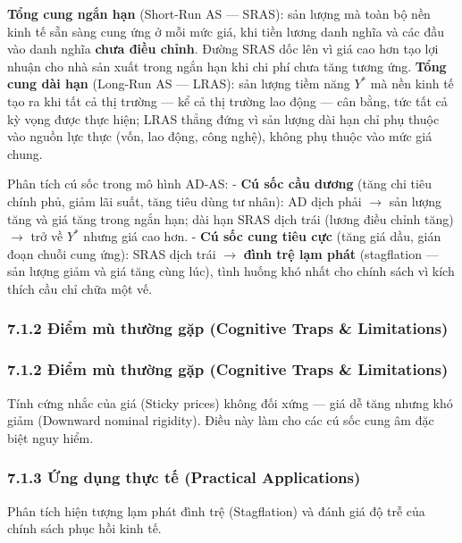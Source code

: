 \documentclass[
]{article}
\begin{document}
\textbf{Tổng cung ngắn hạn} (Short-Run AS --- SRAS): sản lượng mà toàn
bộ nền kinh tế sẵn sàng cung ứng ở mỗi mức giá, khi tiền lương danh
nghĩa và các đầu vào danh nghĩa \textbf{chưa điều chỉnh}. Đường SRAS dốc
lên vì giá cao hơn tạo lợi nhuận cho nhà sản xuất trong ngắn hạn khi chi
phí chưa tăng tương ứng. \textbf{Tổng cung dài hạn} (Long-Run AS ---
LRAS): sản lượng tiềm năng \(Y^*\) mà nền kinh tế tạo ra khi tất cả thị
trường --- kể cả thị trường lao động --- cân bằng, tức tất cả kỳ vọng
được thực hiện; LRAS thẳng đứng vì sản lượng dài hạn chỉ phụ thuộc vào
nguồn lực thực (vốn, lao động, công nghệ), không phụ thuộc vào mức giá
chung.

Phân tích cú sốc trong mô hình AD-AS: - \textbf{Cú sốc cầu dương} (tăng
chi tiêu chính phủ, giảm lãi suất, tăng tiêu dùng tư nhân): AD dịch phải
\(\rightarrow\) sản lượng tăng và giá tăng trong ngắn hạn; dài hạn SRAS
dịch trái (lương điều chỉnh tăng) \(\rightarrow\) trở về \(Y^*\) nhưng
giá cao hơn. - \textbf{Cú sốc cung tiêu cực} (tăng giá dầu, gián đoạn
chuỗi cung ứng): SRAS dịch trái \(\rightarrow\) \textbf{đình trệ lạm
phát} (stagflation --- sản lượng giảm và giá tăng cùng lúc), tình huống
khó nhất cho chính sách vì kích thích cầu chỉ chữa một vế.

\subsubsection{7.1.2 Điểm mù thường gặp (Cognitive Traps \&
Limitations)}\label{ux111iux1ec3m-muxf9-thux1b0ux1eddng-gux1eb7p-cognitive-traps-limitations-31}

\subsubsection{7.1.2 Điểm mù thường gặp (Cognitive Traps \&
Limitations)}\label{ux111iux1ec3m-muxf9-thux1b0ux1eddng-gux1eb7p-cognitive-traps-limitations-32}

Tính cứng nhắc của giá (Sticky prices) không đối xứng --- giá dễ tăng
nhưng khó giảm (Downward nominal rigidity). Điều này làm cho các cú sốc
cung âm đặc biệt nguy hiểm.

\subsubsection{7.1.3 Ứng dụng thực tế (Practical
Applications)}\label{ux1ee9ng-dux1ee5ng-thux1ef1c-tux1ebf-practical-applications-17}

Phân tích hiện tượng lạm phát đình trệ (Stagflation) và đánh giá độ trễ
của chính sách phục hồi kinh tế.
\end{document}
